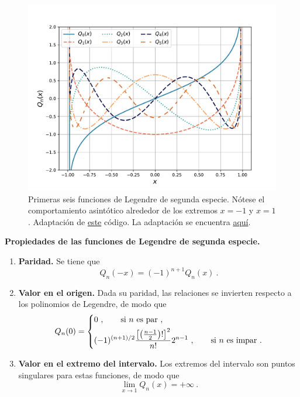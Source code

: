 \begin{figure}[htbp]
    \centering
    \includegraphics[width=12cm]{Figuras/Legendre-second-kind.pdf}
    \caption{Primeras seis funciones de Legendre de segunda especie. Nótese el comportamiento asintótico alrededor de los extremos $x = -1$ y $x=1$. Adaptación de \href{https://github.com/gfrubi/FM2/blob/master/figuras-editables/fig-Legendre.py}{este} código. La adaptación se encuentra \href{https://github.com/Pedroga-cc/Fisica-Matematica-II/blob/main/Figuras/Plotter_Legendre.py}{aquí}.}
    \label{fig:Legendre-second-kind}
\end{figure}

\begin{propiedad}
    \textbf{Propiedades de las funciones de Legendre de segunda especie.}

    \begin{enumerate}
        \item \textbf{Paridad.} Se tiene que
        \begin{equation}
            Q_n(-x) = (-1)^{n+1} Q_n(x) \ .
        \end{equation}
        \item \textbf{Valor en el origen.} Dada su paridad, las relaciones se invierten respecto a los polinomios de Legendre, de modo que
        \begin{equation}
            Q_n(0) = \begin{dcases}
                0 \ , \qquad \text{si } n \text{ es par} \ , \\
                (-1)^{(n+1)/2} \frac{\left[ \left( \frac{n-1}{2} \right)! \right]^2}{n!} 2^{n-1} \ , \qquad \text{si } n \text{ es impar} \ .  
            \end{dcases}
        \end{equation}
        \item \textbf{Valor en el extremo del intervalo.} Los extremos del intervalo son puntos singulares para estas funciones, de modo que
        \begin{equation}
            \lim_{x \to 1} Q_n(x) = +\infty \ .
        \end{equation}
    \end{enumerate} 
\end{propiedad}


